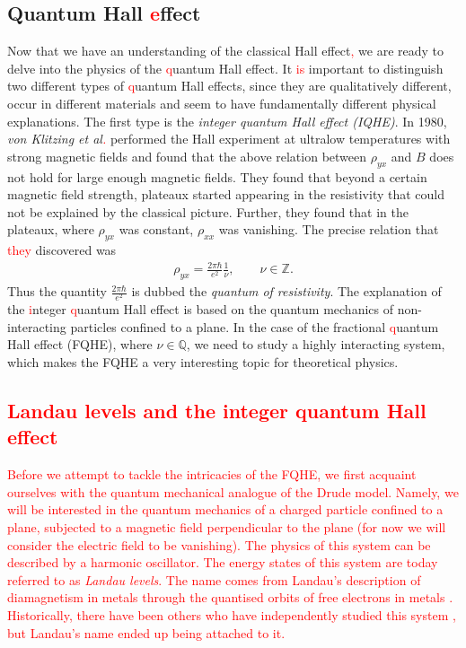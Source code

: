         \subsection{Quantum Hall \textcolor{red}{e}ffect}
        Now that we have an understanding of the classical Hall effect\textcolor{red}{,} we are ready to delve into the physics of the \textcolor{red}{q}uantum Hall effect. It \textcolor{red}{is} important to distinguish two different types of \textcolor{red}{q}uantum Hall effects, since they are qualitatively different, occur in different materials and seem to have fundamentally different physical explanations.
        The first type is the \textit{integer quantum Hall effect (IQHE)}. In 1980, \colorbox{red}{ } \textit{von Klitzing et al\textcolor{red}{.}} \cite{vonKlitzing:1980pdk} performed the Hall experiment at ultralow temperatures with strong magnetic fields and found that the above relation between $\rho_{yx}$ and $B$ does not hold for large enough magnetic fields. They found that beyond a certain magnetic field strength, plateaux started appearing in the resistivity that could not be explained by the classical picture. Further, they found that in the plateaux, where $\rho_{yx}$ was constant, $\rho_{xx}$ was vanishing. The precise relation that \textcolor{red}{they} discovered was
        \begin{align}
            \rho_{yx} = \frac{2 \pi \hbar}{e^2} \frac{1}{\nu}, \qquad \nu \in \mathbb{Z}.
        \end{align}
        Thus the quantity $\frac{2 \pi \hbar}{e^2}$ is dubbed the \textit{quantum of resistivity}. The explanation of the \textcolor{red}{i}nteger \textcolor{red}{q}uantum Hall effect is based on the quantum mechanics of non-interacting particles confined to a plane. In the case of the fractional \textcolor{red}{q}uantum Hall effect (FQHE), where $\nu \in \mathbb{Q}$, we need to study a highly interacting system, which makes the FQHE a very interesting topic for theoretical physics.

 \textcolor{red}{\subsection{Landau levels and the integer quantum Hall effect}}

\textcolor{red}{Before we attempt to tackle the intricacies of the FQHE, we first acquaint ourselves with the quantum mechanical analogue of the Drude model. Namely, we will be interested in the quantum mechanics of a charged particle confined to a plane, subjected to a magnetic field perpendicular to the plane (for now we will consider the electric field to be vanishing). The physics of this system can be described by a harmonic oscillator. The energy states of this system are today referred to as \textit{Landau levels}. The name comes from Landau's description of diamagnetism in metals through the quanti\textcolor{red}{s}ed orbits of free electrons in metals \cite{Landau1930}. Historically, there have been others who have independently studied this system \cite{Rabi1928, Fock1928, FrenkelBronshtein1930}, but Landau's name ended up being attached to it.}

